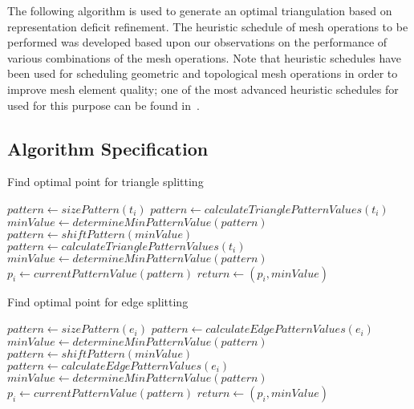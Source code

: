 The following algorithm is used to generate an optimal triangulation
based on representation deficit refinement.  The heuristic schedule of 
mesh operations to be performed was developed based upon our observations 
on the performance of various combinations of the mesh operations.
Note that heuristic schedules have been used for scheduling geometric and 
topological mesh operations in order to improve mesh element quality; one 
of the most advanced heuristic schedules for used for this purpose can be 
found in~\cite{tet_aggressive}.

\subsection{Algorithm Specification}
\begin{algorithm}[H]
\begin{algorithmic}
\caption{Find optimal point for triangle splitting}
 
  \State $pattern \gets sizePattern\left( t_i \right)$
  \State $pattern \gets calculateTrianglePatternValues\left( t_i \right)$
  \State $minValue \gets determineMinPatternValue\left( pattern \right)$
    \State $pattern \gets shiftPattern\left( minValue \right)$
    \State $pattern \gets calculateTrianglePatternValues\left( t_i \right)$
    \State $minValue \gets determineMinPatternValue\left( pattern \right)$
  \EndWhile
  \State $p_i \gets currentPatternValue\left( pattern \right)$
  \State $return \gets \left( p_i, minValue \right)$
\EndProcedure
\end{algorithmic}
\end{algorithm}

\begin{algorithm}[H]
\begin{algorithmic}
\caption{Find optimal point for edge splitting}
 
  \State $pattern \gets sizePattern\left( e_i \right)$
  \State $pattern \gets calculateEdgePatternValues\left( e_i \right)$
  \State $minValue \gets determineMinPatternValue\left( pattern \right)$
    \State $pattern \gets shiftPattern\left( minValue \right)$
    \State $pattern \gets calculateEdgePatternValues\left( e_i \right)$
    \State $minValue \gets determineMinPatternValue\left( pattern \right)$
  \EndWhile
  \State $p_i \gets currentPatternValue\left( pattern \right)$
  \State $return \gets \left( p_i, minValue \right)$
\EndProcedure
\end{algorithmic}
\end{algorithm}

